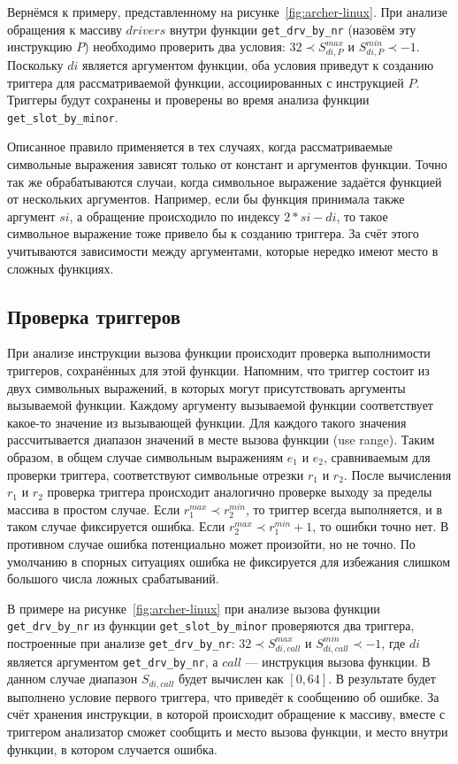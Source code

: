 Вернёмся к примеру, представленному на
рисунке~\ref{fig:archer-linux}. При анализе обращения к массиву
$drivers$ внутри функции \texttt{get\_drv\_by\_nr} (назовём эту инструкцию
$P$) необходимо проверить два условия: $32 \prec S_{di, P}^{max}$ и
$S_{di, P}^{min} \prec -1$. Поскольку $di$ является аргументом
функции, оба условия приведут к созданию триггера для рассматриваемой
функции, ассоциированных с инструкцией $P$. Триггеры будут сохранены и
проверены во время анализа функции \texttt{get\_slot\_by\_minor}.

Описанное правило применяется в тех случаях, когда рассматриваемые
символьные выражения зависят только от констант и аргументов
функции. Точно так же обрабатываются случаи, когда символьное
выражение задаётся функцией от нескольких аргументов. Например, если
бы функция принимала также аргумент $si$, а обращение происходило по
индексу $2 * si - di$, то такое символьное выражение тоже привело бы к
созданию триггера. За счёт этого учитываются зависимости между
аргументами, которые нередко имеют место в сложных функциях.

\subsection{Проверка триггеров}

При анализе инструкции вызова функции происходит проверка выполнимости
триггеров, сохранённых для этой функции. Напомним, что триггер состоит
из двух символьных выражений, в которых могут присутствовать аргументы
вызываемой функции. Каждому аргументу вызываемой функции соответствует
какое-то значение из вызывающей функции. Для каждого такого значения
рассчитывается диапазон значений в месте вызова функции (use
range). Таким образом, в общем случае символьным выражениям $e_1$ и
$e_2$, сравниваемым для проверки триггера, соответствуют символьные
отрезки $r_1$ и $r_2$. После вычисления $r_1$ и $r_2$ проверка
триггера происходит аналогично проверке выходу за пределы массива в
простом случае. Если $r_1^{max} \prec r_2^{min}$, то триггер всегда
выполняется, и в таком случае фиксируется ошибка. Если
$r_2^{max} \prec r_1^{min} + 1$, то ошибки точно нет. В противном
случае ошибка потенциально может произойти, но не точно. По умолчанию
в спорных ситуациях ошибка не фиксируется для избежания слишком
большого числа ложных срабатываний.

В примере на рисунке~\ref{fig:archer-linux} при анализе вызова функции
\texttt{get\_drv\_by\_nr} из функции \texttt{get\_slot\_by\_minor} проверяются два
триггера, построенные при анализе \texttt{get\_drv\_by\_nr}:
$32 \prec S_{di, call}^{max}$ и $S_{di, call}^{min} \prec -1$, где
$di$ является аргументом \texttt{get\_drv\_by\_nr}, а $call$ --- инструкция
вызова функции. В данном случае диапазон $S_{di, call}$ будет вычислен
как $[0, 64]$. В результате будет выполнено условие первого триггера,
что приведёт к сообщению об ошибке. За счёт хранения инструкции, в
которой происходит обращение к массиву, вместе с триггером анализатор
сможет сообщить и место вызова функции, и место внутри функции, в
котором случается ошибка.

